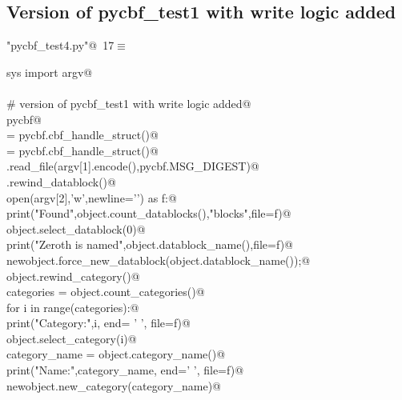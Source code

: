 \documentclass[10pt,a4paper,twoside,notitlepage]{article}
\begin{document}
\subsection{Version of pycbf_test1 with write logic added}

\begin{flushleft} \small
\begin{minipage}{\linewidth}\label{scrap16}\raggedright\small
{} \verb@"pycbf_test4.py"@\nobreak\ {\footnotesize {17}}$\equiv$
\vspace{-1ex}
\begin{list}{}{} \item
\mbox{}\verb@from sys import argv@\\
\mbox{}\verb@@\\
\mbox{}\verb@# version of pycbf_test1 with write logic added@\\
\mbox{}\verb@import pycbf@\\
\mbox{}\verb@object = pycbf.cbf_handle_struct()@\\
\mbox{}\verb@newobject = pycbf.cbf_handle_struct()@\\
\mbox{}\verb@object.read_file(argv[1].encode(),pycbf.MSG_DIGEST)@\\
\mbox{}\verb@object.rewind_datablock()@\\
\mbox{}\verb@with open(argv[2],'w',newline='\n') as f:@\\
\mbox{}\verb@    print("Found",object.count_datablocks(),"blocks",file=f)@\\
\mbox{}\verb@    object.select_datablock(0)@\\
\mbox{}\verb@    print("Zeroth is named",object.datablock_name(),file=f)@\\
\mbox{}\verb@    newobject.force_new_datablock(object.datablock_name());@\\
\mbox{}\verb@    object.rewind_category()@\\
\mbox{}\verb@    categories = object.count_categories()@\\
\mbox{}\verb@    for i in range(categories):@\\
\mbox{}\verb@        print("Category:",i, end= ' ', file=f)@\\
\mbox{}\verb@        object.select_category(i)@\\
\mbox{}\verb@        category_name = object.category_name()@\\
\mbox{}\verb@        print("Name:",category_name, end=' ', file=f)@\\
\mbox{}\verb@        newobject.new_category(category_name)@\\

\end{list}
\end{minipage}
\end{flushleft}
\end{document}
